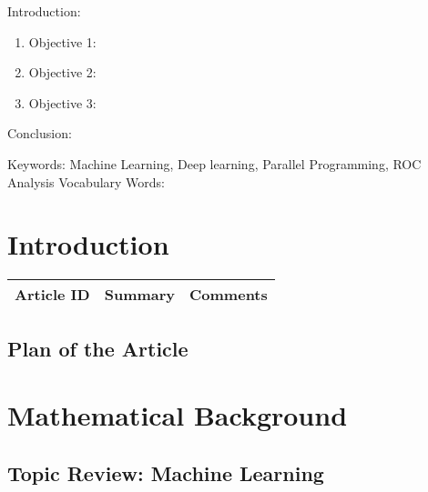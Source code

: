 


\twocolumn
\scriptsize
\begin{frontmatter}
		\title{}
		\author{}
		\address{The Mathematical Learning Space}
\end{frontmatter}	

Introduction:
\begin{enumerate}
\item Objective 1:
\item Objective 2:
\item Objective 3:
\end{enumerate}
Conclusion:

Keywords: Machine Learning, Deep learning, Parallel Programming, ROC Analysis 
Vocabulary Words:

\section{Introduction}

\begin{table}[H]\centering
	\begin{tabular}{p{1cm}p{4cm}p{3cm}}
		Article ID & Summary & Comments\\
		\hline
		\hline
	\end{tabular}
\end{table}

\subsection{Plan of the Article}

\begin{enumerate}
\end{enumerate}

\section{Mathematical Background}

\subsection{Topic Review: Machine Learning}

